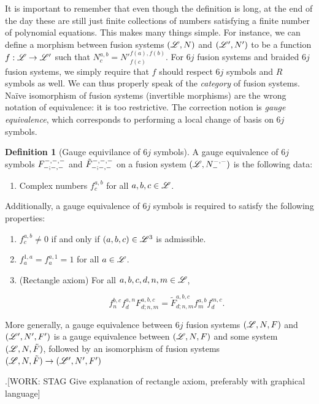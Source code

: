 \documentclass{article}
\theoremstyle{definition}
\newtheorem*{definition}{Definition}
\numberwithin{figure}{section}
\begin{document}
It is important to remember that even though the definition is long, at the end of the day these are still just finite collections of numbers satisfying a finite number of polynomial equations. This makes many things simple. For instance, we can define a morphism between fusion systems $(\mathscr{L},N)$ and $(\mathscr{L}',N')$ to be a function $f:\mathscr{L}\to \mathscr{L}'$ such that $N^{a,b}_{c}=N'^{f(a),f(b)}_{f(c)}$. For $6j$ fusion systems and braided $6j$ fusion systems, we simply require that $f$ should respect $6j$ symbols and $R$ symbols as well. We can thus properly speak of the \textit{category} of fusion systems. Naïve isomorphism of fusion systems (invertible morphisms) are the wrong notation of equivalence: it is too restrictive. The correction notion is \textit{gauge equivalence}, which corresponds to performing a local change of basis on $6j$ symbols.

\begin{definition}[Gauge equivilance of $6j$ symbols] A gauge equivalence of $6j$ symbols $F^{\--,\--,\--}_{\--;\--,\--}$ and $\tilde{F}^{\--,\--,\--}_{\--;\--,\--}$ on a fusion system $(\mathscr{L},N^{\--,\--}_{\--})$ is the following data:

\begin{enumerate}
\item Complex numbers $f^{a,b}_{c}$ for all $a,b,c\in \mathscr{L}$.
\end{enumerate}

Additionally, a gauge equivalence of $6j$ symbols is required to satisfy the following properties:

\begin{enumerate}
\item $f^{a,b}_{c}\neq 0$ if and only if $(a,b,c)\in \mathscr{L}^3$ is admissible.
\item $f^{1,a}_{a}=f^{a,1}_{a}=1$ for all $a\in \mathscr{L}$.
\item (Rectangle axiom) For all $a,b,c,d,n,m\in \mathscr{L}$,

$$f_n^{b,c}f^{a,n}_{d}F^{a,b,c}_{d;n,m}=\tilde{F}^{a,b,c}_{d;n,m}f^{a,b}_{m}f^{m,c}_{d}.$$
\end{enumerate}
\raggedleft\qedsymbol{}
\end{definition}

More generally, a gauge equivalence between $6j$ fusion systems $(\mathscr{L},N,F)$ and $(\mathscr{L}',N',F')$ is a gauge equivalence between $(\mathscr{L},N,F)$ and some system $(\mathscr{L},N,\tilde{F})$, followed by an isomorphism of fusion systems $(\mathscr{L},N,\tilde{F})\to (\mathscr{L}',N',F')$

.[WORK: STAG Give explanation of rectangle axiom, preferably with graphical language]
\end{document}
